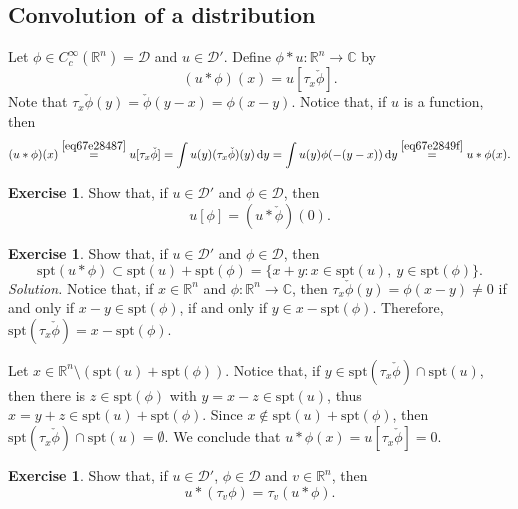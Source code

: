 \documentclass[a4paper,9pt]{amsart}
\newcommand{\scr}[1]{\mathscr{#1}}
\newcommand{\R}{\mathbb{R}}	%
\newcommand{\C}{\mathbb{C}}	%
\newcommand{\did}{\,\mathrm{d}}	%
\newcommand{\spt}{\mathrm{spt}}
\theoremstyle{plain}
\theoremstyle{definition}
\newtheorem{exercise}[proposition]{Exercise}%
\theoremstyle{remark}
\begin{document}
\subsection{Convolution of a distribution}\label{subs67df2648}
Let $\phi\in C^\infty_c(\R^n) = \scr D$ and $u\in\scr D'$.
Define $\phi*u : \R^n\to\C$ by
\begin{equation}\label{eq67e28487}
	(u*\phi)(x) = u[\tau_x\check\phi] .
\end{equation}
Note that $\tau_x\check\phi(y) = \check\phi(y-x) = \phi(x-y)$.
Notice that, if $u$ is a function, then
\begin{equation}
	(u*\phi)(x)
	\overset{\eqref{eq67e28487}}= u[\tau_x\check\phi]
	= \int u(y) (\tau_x\check\phi)(y) \did y
	= \int u(y) \phi(-(y-x)) \did y
	\overset{\eqref{eq67e2849f}}= u*\phi(x) .
\end{equation}

\begin{exercise}
	Show that, if $u\in\scr D'$ and $\phi\in\scr D$, then
	\begin{equation}\label{eq67e28b61}
		u[\phi] = (u*\check\phi)(0) .
	\end{equation}
\end{exercise}

\begin{exercise}
	Show that, if $u\in\scr D'$ and $\phi\in\scr D$, then 
	\begin{equation}\label{eq67f2b0f5}
		\spt(u*\phi) \subset \spt(u) + \spt(\phi)
		= \{x+y: x\in\spt(u),\ y\in\spt(\phi) \} .
	\end{equation}
	{\it Solution.}
	Notice that, if $x\in\R^n$ and $\phi:\R^n\to\C$, then $\tau_x\check\phi(y) = \phi(x-y) \neq 0$ if and only if $x-y\in\spt(\phi)$, if and only if $y\in x-\spt(\phi)$.
	Therefore, $\spt(\tau_x\check\phi) = x-\spt(\phi)$.
	
	Let $x\in\R^n\setminus ( \spt(u) + \spt(\phi))$.
	Notice that, if $y \in \spt(\tau_x\check\phi)\cap \spt(u)$,
	then there is $z\in\spt(\phi)$ with $y=x-z\in\spt(u)$,
	thus $x = y+z \in \spt(u) + \spt(\phi)$.
	Since $x\notin \spt(u) + \spt(\phi)$, then $\spt(\tau_x\check\phi)\cap \spt(u)=\emptyset$.
	We conclude that $u*\phi(x) = u[\tau_x\check\phi] = 0$.
\end{exercise}

\begin{exercise}
	Show that, if $u\in\scr D'$, $\phi\in\scr D$ and $v\in\R^n$, then
	\begin{equation}\label{eq67ebace9}
		u*(\tau_v\phi) = \tau_v(u*\phi) .
	\end{equation}
\end{exercise}
\end{document}
